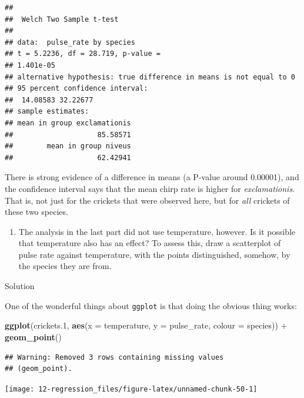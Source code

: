 \documentclass[]{tufte-book}
\newenvironment{Shaded}{}{}
\newcommand{\DataTypeTok}[1]{\textcolor[rgb]{0.56,0.13,0.00}{#1}}
\newcommand{\FloatTok}[1]{\textcolor[rgb]{0.25,0.63,0.44}{#1}}
\newcommand{\KeywordTok}[1]{\textcolor[rgb]{0.00,0.44,0.13}{\textbf{#1}}}
\newcommand{\NormalTok}[1]{#1}
\newcommand{\OperatorTok}[1]{\textcolor[rgb]{0.40,0.40,0.40}{#1}}
\newcommand{\StringTok}[1]{\textcolor[rgb]{0.25,0.44,0.63}{#1}}
\providecommand{\tightlist}{%
  \setlength{\itemsep}{0pt}\setlength{\parskip}{0pt}}
\theoremstyle{definition}
\theoremstyle{definition}
\theoremstyle{definition}
\theoremstyle{remark}
\begin{document}
\begin{verbatim}
## 
##  Welch Two Sample t-test
## 
## data:  pulse_rate by species
## t = 5.2236, df = 28.719, p-value =
## 1.401e-05
## alternative hypothesis: true difference in means is not equal to 0
## 95 percent confidence interval:
##  14.08583 32.22677
## sample estimates:
## mean in group exclamationis 
##                    85.58571 
##        mean in group niveus 
##                    62.42941
\end{verbatim}

There is strong evidence of a difference in means (a P-value around
0.00001), and the confidence interval says that the mean chirp rate is
higher for \emph{exclamationis}. That is, not just for the crickets that
were observed here, but for \emph{all} crickets of these two species.

\begin{enumerate}
\def\labelenumi{(\alph{enumi})}
\setcounter{enumi}{6}
\tightlist
\item
  The analysis in the last part did not use temperature, however. Is it
  possible that temperature also has an effect? To assess this, draw a
  scatterplot of pulse rate against temperature, with the points
  distinguished, somehow, by the species they are from.
\end{enumerate}

Solution

One of the wonderful things about \texttt{ggplot} is that doing the
obvious thing works:

\begin{Shaded}
\begin{Highlighting}[]
\KeywordTok{ggplot}\NormalTok{(crickets}\FloatTok{.1}\NormalTok{, }\KeywordTok{aes}\NormalTok{(}\DataTypeTok{x =}\NormalTok{ temperature, }\DataTypeTok{y =}\NormalTok{ pulse_rate, }
    \DataTypeTok{colour =}\NormalTok{ species)) }\OperatorTok{+}\StringTok{ }\KeywordTok{geom_point}\NormalTok{()}
\end{Highlighting}
\end{Shaded}

\begin{verbatim}
## Warning: Removed 3 rows containing missing values
## (geom_point).
\end{verbatim}

\texttt{[image: 12-regression\_files/figure-latex/unnamed-chunk-50-1]}
\end{document}
